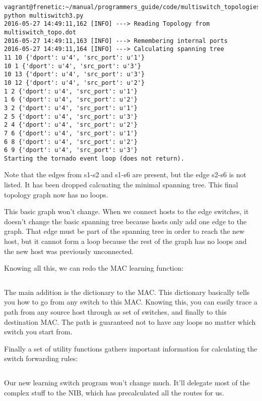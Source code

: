 \begin{verbatim}
vagrant@frenetic:~/manual/programmers_guide/code/multiswitch_topologies$ python multiswitch3.py
2016-05-27 14:49:11,162 [INFO] ---> Reading Topology from multiswitch_topo.dot
2016-05-27 14:49:11,163 [INFO] ---> Remembering internal ports
2016-05-27 14:49:11,164 [INFO] ---> Calculating spanning tree
11 10 {'dport': u'4', 'src_port': u'1'}
10 1 {'dport': u'4', 'src_port': u'3'}
10 13 {'dport': u'4', 'src_port': u'3'}
10 12 {'dport': u'4', 'src_port': u'2'}
1 2 {'dport': u'4', 'src_port': u'1'}
1 6 {'dport': u'4', 'src_port': u'2'}
3 2 {'dport': u'4', 'src_port': u'1'}
2 5 {'dport': u'4', 'src_port': u'3'}
2 4 {'dport': u'4', 'src_port': u'2'}
7 6 {'dport': u'4', 'src_port': u'1'}
6 8 {'dport': u'4', 'src_port': u'2'}
6 9 {'dport': u'4', 'src_port': u'3'}
Starting the tornado event loop (does not return).
\end{verbatim}

Note that the edges from s1-s2 and s1-s6 are present, but the edge s2-s6 is not listed.  It has been 
dropped calcuating the minimal spanning tree.  This final topology graph now has no loops.

This basic graph won't change.  When we connect hosts to the edge switches, it doesn't change the basic
spanning tree because hosts only add one edge to the graph.  That edge must be part of the spanning tree
in order to reach the new host, but it cannot form a loop because the rest of the graph has no loops
and the new host was previously unconnected.  

Knowing all this, we can redo the MAC learning function:

\inputminted[firstline=88,lastline=116]{python}{code/multiswitch_topologies/network_information_base_from_file.py}

The main addition is the  dictionary to the MAC.   This dictionary basically tells you how to
go from any switch to this MAC.  Knowing this, you can easily trace a path from any source host through as set
of switches, and finally to this destination MAC.  The path is guaranteed not to have any loops no matter
which switch you start from.  

Finally a set of utility functions gathers important information for calculating the switch 
forwarding rules:

\inputminted[firstline=74,lastline=84]{python}{code/multiswitch_topologies/network_information_base_from_file.py}

Our new learning switch program won't change much.  It'll delegate most of the complex stuff to the 
NIB, which has precalculated all the routes for us.  

